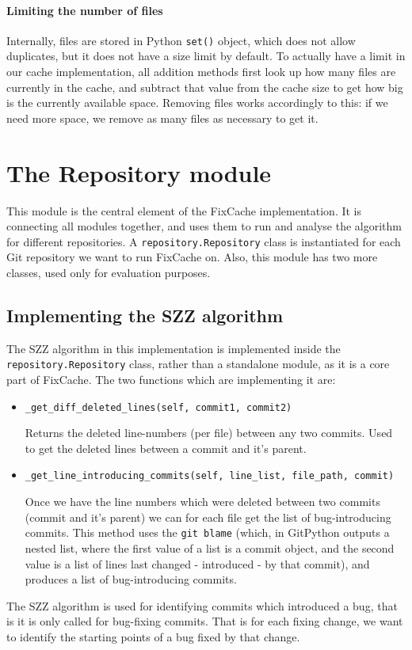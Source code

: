 \documentclass[12pt,twoside,notitlepage]{report}
\newcommand{\fxch}{FixCache}
\begin{document}
\paragraph{Limiting the number of files}
Internally, files are stored in Python \texttt{set()} object, which does not allow duplicates, but it does not have a size limit by default. To actually have a limit in our cache implementation, all addition methods first look up how many files are currently in the cache, and subtract that value from the cache size to get how big is the currently available space. Removing files works accordingly to this: if we need more space, we remove as many files as necessary to get it.
\section{The Repository module}
This module is the central element of the \fxch{} implementation. It is connecting all modules together, and uses them to run and analyse the algorithm for different repositories. A \texttt{repository.Repository} class is instantiated for each Git repository we want to run \fxch{} on. Also, this module has two more classes, used only for evaluation purposes.

\subsection{Implementing the SZZ algorithm}
The SZZ algorithm in this implementation is implemented inside the \texttt{repository.Repository} class, rather than a standalone module, as it is a core part of \fxch{}. 
\clearpage
The two functions which are implementing it are:
\begin{itemize}
\item \texttt{\_get\_diff\_deleted\_lines(self, commit1, commit2)}

Returns the deleted line-numbers (per file) between any two commits. Used to get the deleted lines between a commit and it's parent.
\item \texttt{\_get\_line\_introducing\_commits(self, line\_list, file\_path, commit)}

Once we have the line numbers which were deleted between two commits (commit and it's parent) we can for each file get the list of bug-introducing commits. This method uses the \texttt{git blame} (which, in GitPython outputs a nested list, where the first value of a list is a commit object, and the second value is a list of lines last changed - introduced - by that commit), and produces a list of bug-introducing commits.
\end{itemize}
The SZZ algorithm is used for identifying commits which introduced a bug, that is it is only called for bug-fixing commits. That is for each fixing change, we want to identify the starting points of a bug fixed by that change.
\end{document}

